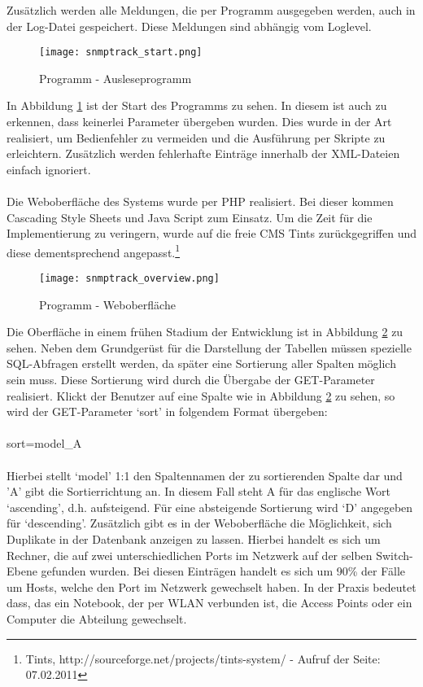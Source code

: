 Zusätzlich werden alle Meldungen, die per Programm ausgegeben werden, auch in der Log-Datei gespeichert.
Diese Meldungen sind abhängig vom Loglevel.
\\
\begin{figure}[H]
\centering
\texttt{[image: snmptrack\_start.png]}
\caption{Programm - Ausleseprogramm}
\label{fig:snmptrack_start}
\end{figure}
In Abbildung \ref{fig:snmptrack_start} ist der Start des Programms zu sehen. In diesem ist auch zu erkennen, dass keinerlei Parameter übergeben wurden. Dies wurde in der Art realisiert, um Bedienfehler zu vermeiden und die Ausführung per Skripte zu erleichtern.
Zusätzlich werden fehlerhafte Einträge innerhalb der XML-Dateien einfach ignoriert.\\\\
Die Weboberfläche des Systems wurde per PHP realisiert.
Bei dieser kommen Cascading Style Sheets und Java Script zum Einsatz.
Um die Zeit für die Implementierung zu veringern, wurde auf die freie CMS Tints zurückgegriffen und diese dementsprechend angepasst.\footnote{Tints, http://sourceforge.net/projects/tints-system/ - Aufruf der Seite: 07.02.2011}
\\
\begin{figure}[H]
\centering
\texttt{[image: snmptrack\_overview.png]}
\caption{Programm - Weboberfläche}
\label{fig:snmptrack_overview}
\end{figure}
Die Oberfläche in einem frühen Stadium der Entwicklung ist in Abbildung \ref{fig:snmptrack_overview} zu sehen.
Neben dem Grundgerüst für die Darstellung der Tabellen müssen spezielle SQL-Abfragen erstellt werden, da später eine Sortierung aller Spalten möglich sein muss.
Diese Sortierung wird durch die Übergabe der GET-Parameter realisiert. Klickt der Benutzer auf eine Spalte wie in Abbildung \ref{fig:snmptrack_overview} zu sehen, so wird der GET-Parameter ‘sort’ in folgendem Format übergeben:\\
\\
sort=model\_A\\
\\
Hierbei stellt ‘model’ 1:1 den Spaltennamen der zu sortierenden Spalte dar und 'A' gibt die Sortierrichtung an. In diesem Fall steht A für das englische Wort ‘ascending’, d.h. aufsteigend. Für eine absteigende Sortierung wird ‘D’ angegeben für ‘descending’.
Zusätzlich gibt es in der Weboberfläche die Möglichkeit, sich Duplikate in der Datenbank anzeigen zu lassen.
Hierbei handelt es sich um Rechner, die auf zwei unterschiedlichen Ports im Netzwerk auf der selben Switch-Ebene gefunden wurden.
Bei diesen Einträgen handelt es sich um 90\% der Fälle um Hosts, welche den Port im Netzwerk gewechselt haben.
In der Praxis bedeutet dass, das ein Notebook, der per WLAN verbunden ist, die Access Points oder ein Computer die Abteilung gewechselt.

